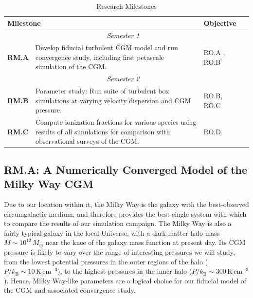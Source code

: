 \documentclass[11pt,letterpaper,english]{article}
\begin{document}
\begin{table}[h]
\caption{Research Milestones}
\label{table:RM}
\begin{tabular}{|l|p{4.7in}|p{0.9in}|l|} 
\hline
\multicolumn{2}{|l|}{\bf Milestone} & {\bf Objective} \\ \hline
\multicolumn{3}{|c|}{\it Semester 1} \\ \hline
\textbf{RM.A} & Develop fiducial turbulent CGM model and run convergence study, including first petascale simulation of the CGM. & RO.A , RO.B \\ \hline
\multicolumn{3}{|c|}{\it Semester 2} \\ \hline
\textbf{RM.B} & Parameter study: Run suite of turbulent box simulations at varying velocity dispersion and CGM pressure. & RO.B, RO.C\\ \hline
\textbf{RM.C} & Compute ionization fractions for various species using results of all simulations for comparison with observational surveys of the CGM. & RO.D \\ \hline
\end{tabular}
\end{table}

\vspace{-.25in}
\subsection{RM.A: A Numerically Converged Model of the Milky Way CGM}
\vspace{-.2in}

Due to our location within it, the Milky Way is the galaxy with the best-observed circumgalactic medium, and therefore provides the best single system with which to compare the results of our simulation campaign. The Milky Way is also a fairly typical galaxy in the local Universe, with a dark matter halo mass $M \sim 10^{12}\,M_\odot$ near the knee of the galaxy mass function at present day. Its CGM pressure is likely to vary over the range of interesting pressures we will study, from the lowest potential pressures in the outer regions of the halo ($P/k_\mathrm{B} \sim 10\,\mathrm{K}\,\mathrm{cm}^{-3}$), to the highest pressures in the inner halo ($P/k_\mathrm{B} \sim 300\,\mathrm{K}\,\mathrm{cm}^{-3}$). Hence, Milky Way-like parameters are a logical choice for our fiducial model of the CGM and associated convergence study.
\end{document}
